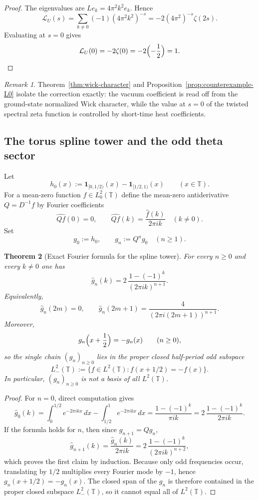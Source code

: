 \documentclass[11pt,a4paper]{article}
\numberwithin{equation}{section}
\newtheorem{theorem}{Theorem}[section]
\theoremstyle{definition}
\theoremstyle{remark}
\newtheorem{remark}[theorem]{Remark}
\begin{document}
\begin{proof}
The eigenvalues are $Le_k=4\pi^2k^2e_k$.  Hence
\[
\mathcal L_U(s)=\sum_{k\ne 0}(-1)(4\pi^2k^2)^{-s}=-2(4\pi^2)^{-s}\zeta(2s).
\]
Evaluating at $s=0$ gives
\[
\mathcal L_U(0)=-2\zeta(0)=-2\Bigl(-\frac12\Bigr)=1.
\]
\end{proof}

\begin{remark}
Theorem~\ref{thm:wick-character} and Proposition~\ref{prop:counterexample-L0} isolate the correction exactly: the vacuum coefficient is read off from the ground-state normalized Wick character, while the value at $s=0$ of the twisted spectral zeta function is controlled by short-time heat coefficients.
\end{remark}

\subsection{The torus spline tower and the odd theta sector}

Let
\[
h_0(x):=\mathbf 1_{[0,1/2)}(x)-\mathbf 1_{[1/2,1)}(x)
\qquad (x\in\mathbb T).
\]
For a mean-zero function $f\in L^2_0(\mathbb T)$ define the mean-zero antiderivative $Q=D^{-1}f$ by Fourier coefficients
\[
\widehat{Qf}(0)=0,
\qquad
\widehat{Qf}(k)=\frac{\widehat f(k)}{2\pi i k}\quad (k\ne 0).
\]
Set
\[
g_0:=h_0,
\qquad
g_n:=Q^n g_0\quad (n\ge 1).
\]

\begin{theorem}[Exact Fourier formula for the spline tower]\label{thm:spline-fourier}
For every $n\ge 0$ and every $k\ne 0$ one has
\[
\widehat g_n(k)=2\,\frac{1-(-1)^k}{(2\pi i k)^{n+1}}.
\]
Equivalently,
\[
\widehat g_n(2m)=0,
\qquad
\widehat g_n(2m+1)=\frac{4}{(2\pi i(2m+1))^{n+1}}.
\]
Moreover,
\[
g_n\Bigl(x+\frac12\Bigr)=-g_n(x)
\qquad (n\ge 0),
\]
so the single chain $(g_n)_{n\ge 0}$ lies in the proper closed half-period odd subspace
\[
L^2_-(\mathbb T):=\bigl\{f\in L^2(\mathbb T):f(x+1/2)=-f(x)\bigr\}.
\]
In particular, $(g_n)_{n\ge 0}$ is not a basis of all $L^2(\mathbb T)$.
\end{theorem}

\begin{proof}
For $n=0$, direct computation gives
\[
\widehat g_0(k)=\int_0^{1/2}e^{-2\pi ikx}\,dx-\int_{1/2}^{1}e^{-2\pi ikx}\,dx
=\frac{1-(-1)^k}{\pi i k}
=2\,\frac{1-(-1)^k}{2\pi i k}.
\]
If the formula holds for $n$, then since $g_{n+1}=Qg_n$,
\[
\widehat g_{n+1}(k)=\frac{\widehat g_n(k)}{2\pi i k}
=2\,\frac{1-(-1)^k}{(2\pi i k)^{n+2}},
\]
which proves the first claim by induction.  Because only odd frequencies occur, translating by $1/2$ multiplies every Fourier mode by $-1$, hence $g_n(x+1/2)=-g_n(x)$.  The closed span of the $g_n$ is therefore contained in the proper closed subspace $L^2_-(\mathbb T)$, so it cannot equal all of $L^2(\mathbb T)$.
\end{proof}
\end{document}
